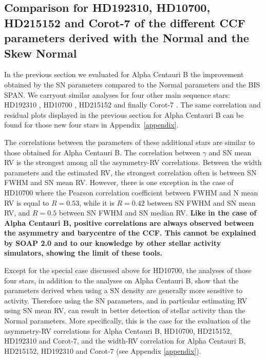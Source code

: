 \documentclass{aa}
\begin{document}
\subsection{Comparison for HD192310, HD10700, HD215152 and Corot-7 of the different CCF parameters derived with the Normal and the Skew Normal} \label{sec:real_data_other_stars}

In the previous section we evaluated for Alpha Centauri B the improvement obtained by the SN parameters compared to the Normal parameters and the BIS SPAN. We carryout similar analyses for four other main sequence stars: HD192310 \citep[K2V,][]{Pepe-2011}, HD10700 \citep[G8V,][]{Feng:2017ac}, HD215152 \citep[K3V,][]{Delisle:2018aa} and finally Corot-7 \citep[K0V,][]{Haywood-2014}. The same correlation and residual plots displayed in the previous section for Alpha Centauri B can be found for those new four stars in Appendix~\ref{appendix}.

The correlations between the parameters of these additional stars are similar to those obtained for Alpha Centauri B. The correlation between $\gamma$ and SN mean RV is the strongest among all the asymmetry-RV correlations. Between the width parameters and the estimated RV, the strongest correlation often is between SN FWHM and SN mean RV. 
However, there is one exception in the case of HD10700 where the Pearson correlation coefficient between FWHM and N mean RV is equal to $R=0.53$, while it is $R=0.42$ between SN FWHM and SN mean RV, and $R=0.5$ between SN FWHM and SN median RV. {\bf Like in the case of Alpha Centauri B, positive correlations are always observed between the asymmetry and barycentre of the CCF. This cannot be explained by SOAP 2.0 and to our knowledge by other stellar activity simulators, showing the limit of these tools.}

Except for the special case discussed above for HD10700, the analyses of those four stars, in addition to the analyses on Alpha Centauri B, show that the parameters derived when using a SN density are generally more sensitive to activity.  
Therefore using the SN parameters, and in particular estimating RV using SN mean RV, can result in better detection of stellar activity than the Normal parameters. 
More specifically, this is the case for the evaluation of the asymmetry-RV correlations for Alpha Centauri B, HD10700, HD215152, HD192310 and Corot-7, and the width-RV correlation for Alpha Centauri B, HD215152, HD192310 and Corot-7 (see Appendix \ref{appendix}).
\end{document}
